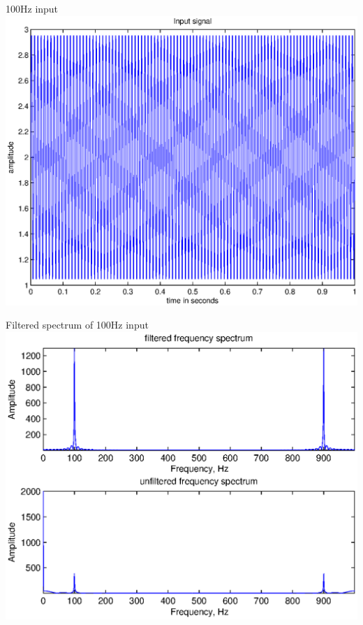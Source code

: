 \documentclass[mathserif]{beamer}
\begin{document}
    
    \begin{frame}{100Hz input}
      \includegraphics[width=\linewidth]{inputSig100Hz}
    \end{frame}

    
    \begin{frame}{Filtered spectrum of 100Hz input}
      \includegraphics[width=\linewidth]{freqSpec100Hz}
    \end{frame}
    
\end{document}
